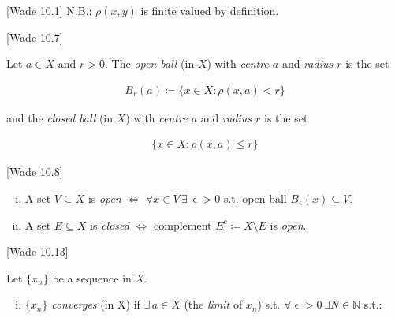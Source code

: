 \documentclass[10pt]{article} %
\newcommand{\cw}[1]{[Wade #1]}
\renewcommand{\leq}{\leqslant}
\begin{document}
\begin{multicols}{3}
\begin{definition}{\cw{10.1}}{}
    N.B.: $\rho(x,y)$ is finite valued by definition.%

\end{definition}

\begin{definition}{\cw{10.7}}{}

    Let $a \in X$ and $r > 0$. The \emph{open ball} (in $X$) with \emph{centre $a$} and \emph{radius $r$} is the set

        \begin{align*}
            B_r(a) \coloneqq \{x \in X: \rho(x,a) < r\}
        \end{align*}

    and the \emph{closed ball} (in $X$) with \emph{centre $a$} and \emph{radius $r$} is the set

        \begin{align*}
            \{x \in X: \rho(x,a) \leq r\}
        \end{align*}

\end{definition}

\begin{definition}{\cw{10.8}}{}

    \begin{enumerate}[i)]
        \setlength{\parskip}{0em}
        \item A set $V \subseteq X$ is \emph{open} $\Leftrightarrow$ $\forall x \in V \, \exists\, \upvarepsilon > 0$ s.t. open ball $B_{\upvarepsilon}(x) \subseteq V$.
        \item A set $E \subseteq X$ is \emph{closed} $\Leftrightarrow$ complement $E^{c} \coloneqq X \setminus E$ is \emph{open}.
    \end{enumerate}

\end{definition}

\begin{definition}{\cw{10.13}}{}

    Let $\{x_n\}$ be a sequence in $X$.

        \begin{enumerate}[i)]
            \setlength{\parskip}{0em}
            \item $\{x_n\}$ \emph{converges} (in X) if $\exists \, a \in X$ (the \emph{limit} of $x_n$) s.t. $\forall \upvarepsilon > 0 \, \exists N \in \mathbb{N}$ s.t.:


\end{enumerate}
\end{definition}
\end{multicols}
\end{document}
